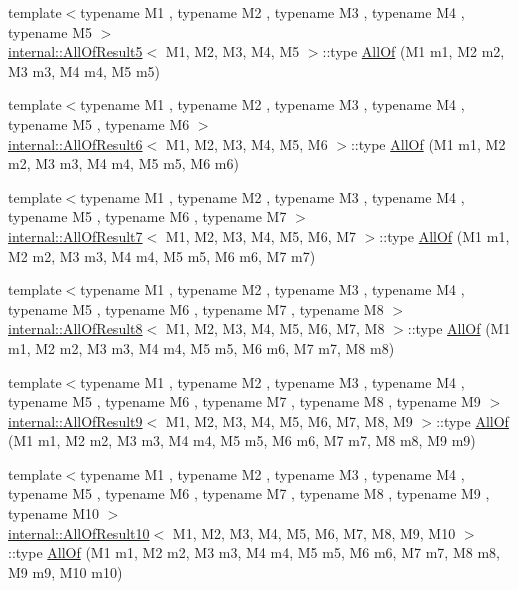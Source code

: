 \begin{DoxyCompactItemize}
\item 
{\footnotesize template$<$typename M1 , typename M2 , typename M3 , typename M4 , typename M5 $>$ }\\\hyperlink{structtesting_1_1internal_1_1_all_of_result5}{internal\+::\+All\+Of\+Result5}$<$ M1, M2, M3, M4, M5 $>$\+::type \hyperlink{namespacetesting_ab8f5e6cf1c22acf51a2b9b376b0ef03a}{All\+Of} (M1 m1, M2 m2, M3 m3, M4 m4, M5 m5)
\item 
{\footnotesize template$<$typename M1 , typename M2 , typename M3 , typename M4 , typename M5 , typename M6 $>$ }\\\hyperlink{structtesting_1_1internal_1_1_all_of_result6}{internal\+::\+All\+Of\+Result6}$<$ M1, M2, M3, M4, M5, M6 $>$\+::type \hyperlink{namespacetesting_afc8e2d405f80e7d3df32842ddb648125}{All\+Of} (M1 m1, M2 m2, M3 m3, M4 m4, M5 m5, M6 m6)
\item 
{\footnotesize template$<$typename M1 , typename M2 , typename M3 , typename M4 , typename M5 , typename M6 , typename M7 $>$ }\\\hyperlink{structtesting_1_1internal_1_1_all_of_result7}{internal\+::\+All\+Of\+Result7}$<$ M1, M2, M3, M4, M5, M6, M7 $>$\+::type \hyperlink{namespacetesting_acbd4eef50126ff6db5b93ac5faa71b45}{All\+Of} (M1 m1, M2 m2, M3 m3, M4 m4, M5 m5, M6 m6, M7 m7)
\item 
{\footnotesize template$<$typename M1 , typename M2 , typename M3 , typename M4 , typename M5 , typename M6 , typename M7 , typename M8 $>$ }\\\hyperlink{structtesting_1_1internal_1_1_all_of_result8}{internal\+::\+All\+Of\+Result8}$<$ M1, M2, M3, M4, M5, M6, M7, M8 $>$\+::type \hyperlink{namespacetesting_a7ec0bc4eca9805e85b9b34bbbf3d3ae2}{All\+Of} (M1 m1, M2 m2, M3 m3, M4 m4, M5 m5, M6 m6, M7 m7, M8 m8)
\item 
{\footnotesize template$<$typename M1 , typename M2 , typename M3 , typename M4 , typename M5 , typename M6 , typename M7 , typename M8 , typename M9 $>$ }\\\hyperlink{structtesting_1_1internal_1_1_all_of_result9}{internal\+::\+All\+Of\+Result9}$<$ M1, M2, M3, M4, M5, M6, M7, M8, M9 $>$\+::type \hyperlink{namespacetesting_aaecf2bd8eb7c68b119f9b81a01942b7f}{All\+Of} (M1 m1, M2 m2, M3 m3, M4 m4, M5 m5, M6 m6, M7 m7, M8 m8, M9 m9)
\item 
{\footnotesize template$<$typename M1 , typename M2 , typename M3 , typename M4 , typename M5 , typename M6 , typename M7 , typename M8 , typename M9 , typename M10 $>$ }\\\hyperlink{structtesting_1_1internal_1_1_all_of_result10}{internal\+::\+All\+Of\+Result10}$<$ M1, M2, M3, M4, M5, M6, M7, M8, M9, M10 $>$\+::type \hyperlink{namespacetesting_a9939c08664efeed0c1983090115f7ecb}{All\+Of} (M1 m1, M2 m2, M3 m3, M4 m4, M5 m5, M6 m6, M7 m7, M8 m8, M9 m9, M10 m10)

\end{DoxyCompactItemize}
